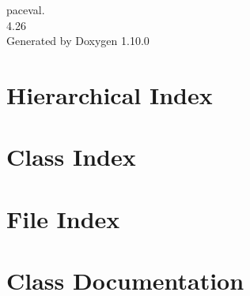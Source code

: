\documentclass[twoside]{book}
\newcommand{\+}{\discretionary{\mbox{\scriptsize$\hookleftarrow$}}{}{}}
\newcommand{\clearemptydoublepage}{%
    \newpage{\pagestyle{empty}\cleardoublepage}%
  }
\begin{document}
  \raggedbottom
    \hypersetup{pageanchor=false,
                bookmarksnumbered=true,
                pdfencoding=unicode
               }
  \begin{titlepage}
  \vspace*{7cm}
  \begin{center}%
  {\Large paceval.}\\
  [1ex]\large 4.\+26 \\
  \vspace*{1cm}
  {\large Generated by Doxygen 1.10.0}\\
  \end{center}
  \end{titlepage}
  \clearemptydoublepage
  \tableofcontents
  \clearemptydoublepage
  \hypersetup{pageanchor=true}

\chapter{Hierarchical Index}

\chapter{Class Index}

\chapter{File Index}

\chapter{Class Documentation}





























\end{document}
